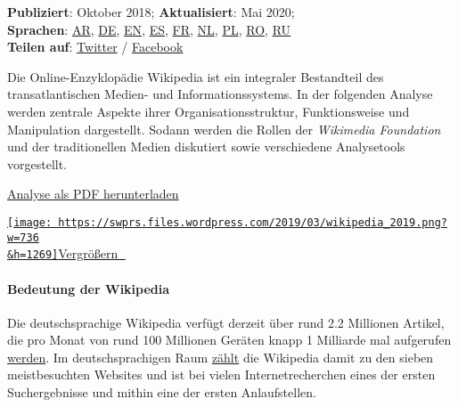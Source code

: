 \textbf{Publiziert}: Oktober 2018; \textbf{Aktualisiert}: Mai 2020;\\
\textbf{Sprachen}:
\href{https://swprs.files.wordpress.com/2020/03/wikipedia-disinformation-operation-arabic.pdf}{AR},
\href{https://swprs.org/propaganda-in-der-wikipedia/}{DE},
\href{https://swprs.org/wikipedia-disinformation-operation/}{EN},
\href{https://swprs.files.wordpress.com/2020/03/wikipedia-disinformation-operation-spanish.pdf}{ES},
\href{https://lumieresurgaia.com/wikipedia-une-operation-de-desinformation/}{FR},
\href{https://swprs.files.wordpress.com/2020/03/wikipedia-disinformation-operation-dutch.pdf}{NL},
\href{https://swprs.files.wordpress.com/2020/03/wikipedia-disinformation-operation-polish.pdf}{PL},
\href{https://evz.ro/wikipedia-o-operatie-de-dezinformare-cine-se-ascunde-in-spatele-acestei-enciclopedii-online.html/2}{RO},
\href{https://kiwibyrd.org/2020/03/20/20h33/}{RU}\\
\textbf{Teilen auf}:
\href{https://twitter.com/intent/tweet?url=https://swprs.org/propaganda-in-der-wikipedia/}{Twitter}
/
\href{https://www.facebook.com/share.php?u=https://swprs.org/propaganda-in-der-wikipedia/}{Facebook}

Die Online-Enzyklopädie Wikipedia ist ein integraler Bestandteil des
transatlantischen Medien- und Informationssystems. In der folgenden
Analyse werden zentrale Aspekte ihrer Organisations­struktur,
Funktionsweise und Manipulation dargestellt. Sodann werden die Rollen
der \emph{Wikimedia Foundation} und der traditionellen Medien diskutiert
sowie verschiedene Analysetools vorgestellt.

\href{https://swprs.files.wordpress.com/2019/09/wikipedia-propaganda-analyse-2019.pdf}{Analyse
als PDF herunterladen}

\href{https://swprs.files.wordpress.com/2019/03/wikipedia_2019.png}{\texttt{[image: https://swprs.files.wordpress.com/2019/03/wikipedia\_2019.png?w=736\\\&h=1269]}Vergrößern
🔎}

\hypertarget{bedeutung-der-wikipedia}{%
\paragraph{Bedeutung der Wikipedia}\label{bedeutung-der-wikipedia}}

Die deutschsprachige Wikipedia verfügt derzeit über rund 2.2 Millionen
Artikel, die pro Monat von rund 100 Millionen Geräten knapp 1 Milliarde
mal aufgerufen
\href{https://stats.wikimedia.org/v2/\#/de.wikipedia.org}{werden}. Im
deutschsprachigen Raum
\href{https://de.wikipedia.org/wiki/Wikipedia:Statistik}{zählt} die
Wikipedia damit zu den sieben meistbesuchten Websites und ist bei vielen
Internetrecherchen eines der ersten Suchergebnisse und mithin eine der
ersten Anlaufstellen.

